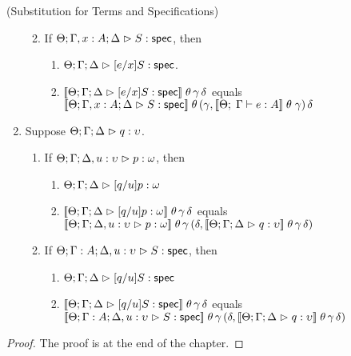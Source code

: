 \begin{lemma}{(Substitution for Terms and Specifications)}
\begin{enumerate}
\begin{enumerate}
\begin{enumerate}
        \end{enumerate}
  \item If $\judgeS[\Theta; \Gamma, x:A; \Delta]{S}$, 
        then 
        \begin{enumerate}
        \item $\judgeS[\Theta; \Gamma; \Delta]{[e/x]S}$.
        \item $\interp{\judgeS[\Theta; \Gamma; \Delta]{[e/x]S}}\;\theta\,\gamma\,\delta$ equals \\
              $\interp{\judgeS[\Theta; \Gamma, x:A; \Delta]{S}}\;\theta\,(\gamma, \interp{\judgeE{\Gamma}{e}{A}}\;\theta\;\gamma)\,\delta$
        \end{enumerate}
  \end{enumerate}
\item Suppose $\judgeA{q}{\upsilon}$.
  \begin{enumerate}
  \item If $\judgeA[\Theta; \Gamma; \Delta, u:\upsilon]{p}{\omega}$, 
        then 
        \begin{enumerate}
          \item $\judgeA[\Theta; \Gamma; \Delta]{[q/u]p}{\omega}$
          \item $\interp{\judgeA[\Theta; \Gamma; \Delta]{[q/u]p}{\omega}}\;\theta\,\gamma\,\delta$ equals \\
                $\interp{\judgeA[\Theta; \Gamma; \Delta, u:\upsilon]{p}{\omega}}\;\theta\,\gamma\,(\delta, \interp{\judgeA{q}{\upsilon}}\;\theta\,\gamma\,\delta)$
        \end{enumerate}
      \item If $\judgeS[\Theta; \Gamma:A; \Delta, u:\upsilon]{S}$, 
        then 
        \begin{enumerate}
          \item $\judgeS[\Theta; \Gamma; \Delta]{[q/u]S}$ 
          \item $\interp{\judgeS[\Theta; \Gamma; \Delta]{[q/u]S}}\;\theta\,\gamma\,\delta$ equals \\
                $\interp{\judgeS[\Theta; \Gamma:A; \Delta, u:\upsilon]{S}}\;\theta\,\gamma\,(\delta, \interp{\judgeA{q}{\upsilon}}\;\theta\,\gamma\,\delta)$
        \end{enumerate}
  \end{enumerate}

\end{enumerate}
\end{lemma}
\begin{proof}
  The proof is at the end of the chapter.
\end{proof}


